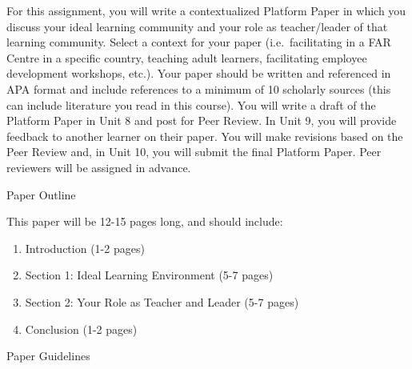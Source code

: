 \documentclass[
]{book}
\providecommand{\tightlist}{%
  \setlength{\itemsep}{0pt}\setlength{\parskip}{0pt}}
\begin{document}
\begin{assessment}
For this assignment, you will write a contextualized Platform Paper in
which you discuss your ideal learning community and your role as
teacher/leader of that learning community. Select a context for your
paper (i.e.~facilitating in a FAR Centre in a specific country, teaching
adult learners, facilitating employee development workshops, etc.). Your
paper should be written and referenced in APA format and include
references to a minimum of 10 scholarly sources (this can include
literature you read in this course). You will write a draft of the
Platform Paper in Unit 8 and post for Peer Review. In Unit 9, you will
provide feedback to another learner on their paper. You will make
revisions based on the Peer Review and, in Unit 10, you will submit the
final Platform Paper. Peer reviewers will be assigned in advance.

{Paper Outline}

This paper will be 12-15 pages long, and should include:

\begin{enumerate}
\def\labelenumi{\arabic{enumi}.}
\tightlist
\item
  Introduction (1-2 pages)\\
\item
  Section 1: Ideal Learning Environment (5-7 pages)\\
\item
  Section 2: Your Role as Teacher and Leader (5-7 pages)\\
\item
  Conclusion (1-2 pages)
\end{enumerate}

{Paper Guidelines}


\end{assessment}
\end{document}
